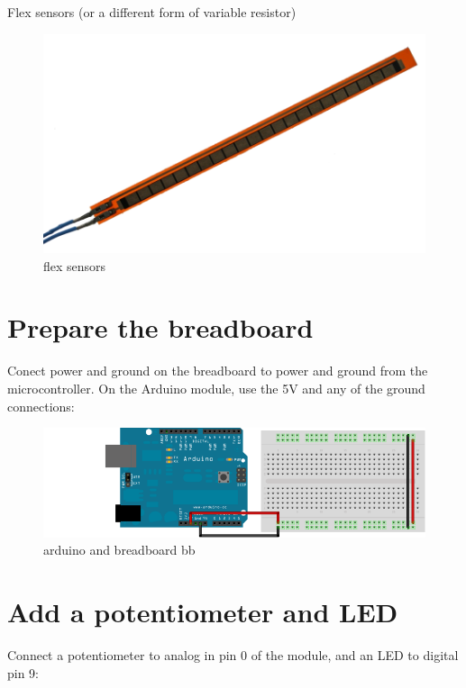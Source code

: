 Flex sensors (or a different form of variable resistor)

\begin{figure}[!htb]
 \centering
 \includegraphics[scale=0.3]{img/analogio/flex_sensors.png}
 \caption{flex sensors}
 \label{flex sensors}
\end{figure}


\section{Prepare the breadboard}

Conect power and ground on the breadboard to power and ground from the microcontroller. On the Arduino module, use the 5V and any of the ground connections:

\begin{figure}[!htb]
 \centering
 \includegraphics[scale=0.3]{img/analogio/arduino_and_breadboard_bb.png}
 \caption{arduino and breadboard bb}
 \label{arduino and breadboard bb}
\end{figure}

\section{Add a potentiometer and LED}

Connect a potentiometer to analog in pin 0 of the module, and an LED to digital pin 9:

